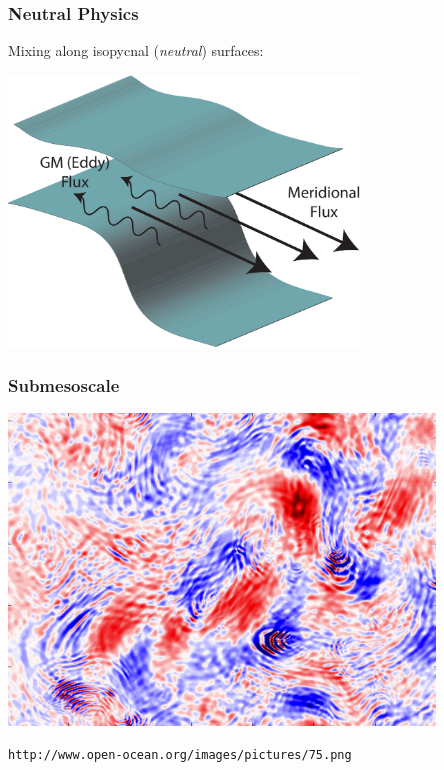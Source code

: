 \documentclass{beamer}
\begin{document}
\begin{frame}
    \frametitle{Neutral Physics}
    
    Mixing along isopycnal (\textit{neutral}) surfaces:
    \begin{center}
        \includegraphics[width=0.7\textwidth]{GMDiagram.pdf}
    \end{center}
\end{frame}

\begin{frame}
    \frametitle{Submesoscale}

    \begin{center}
        \includegraphics[width=0.85\textwidth]{submesoscale.png}
    \end{center}
    {\tiny \lstinline|http://www.open-ocean.org/images/pictures/75.png|}
\end{frame}

\end{document}
